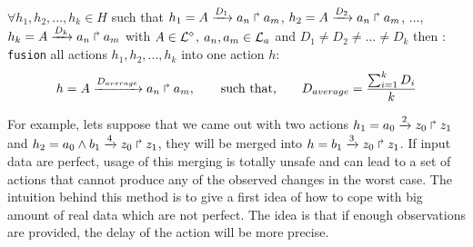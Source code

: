 \begin{definition}
$\forall h_1, h_2,..., h_k \in H$ such that $h_1=A\xrightarrow{D_1} a_n \Rsh a_m$, $h_2=A\xrightarrow{D_2} a_n \Rsh a_m$, ..., $h_k=A\xrightarrow{D_k} a_n \Rsh a_m$ with $ A \in \mathcal{L}^{\diamond}$, $a_n, a_m \in \mathcal{L}_a$ and $D_1 \neq D_2 \neq ... \neq D_k$ then : \\
\texttt{fusion} all actions $h_1, h_2,..., h_k$ into one action $h$: $$h=A\xrightarrow{D_{average}} a_n \Rsh a_m, \hspace{0.7cm} \text{such that,} \hspace{0.7cm} D_{average} = \frac{\sum_{i=1}^k D_{i}}{k} $$
\end{definition}

For example, lets suppose that we came out with two actions $h_1=a_0\xrightarrow{2} z_0 \Rsh z_1$ and $h_2=a_0 \wedge b_1 \xrightarrow{4} z_0 \Rsh z_1$, they will be merged into $h=b_1\xrightarrow{3} z_0 \Rsh z_1$.
If input data are perfect, usage of this merging is totally unsafe and can lead to a set of actions that cannot produce any of the observed changes in the worst case.
The intuition behind this method is to give a first idea of how to cope with big amount of real data which are not perfect.
The idea is that if enough observations are provided, the delay of the action will be more precise.
